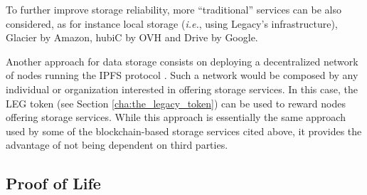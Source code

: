 To further improve storage reliability, more ``traditional'' services can be also considered, as for instance local storage (\textit{i.e.}, using Legacy's infrastructure), Glacier by Amazon, hubiC by OVH and Drive by Google.

Another approach for data storage consists on deploying a decentralized network of nodes running the IPFS protocol \cite{Benet}. Such a network would be composed by any individual or organization interested in offering storage services. In this case, the LEG token (see Section \ref{cha:the_legacy_token}) can be used to reward nodes offering storage services.
While this approach is essentially the same approach used by some of the blockchain-based storage services cited above, it provides the advantage of not being dependent on third parties.


\subsection{Proof of Life} %
\label{sub:proof_of_life}

